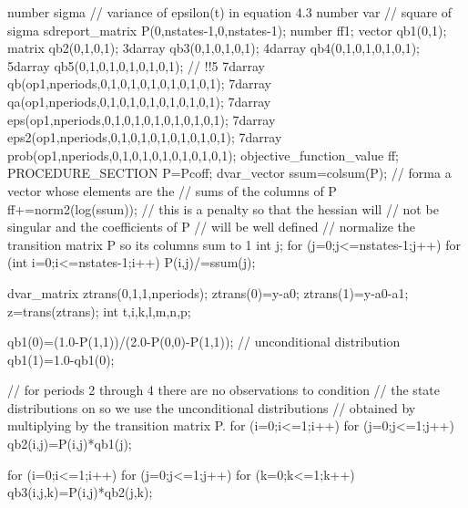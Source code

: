 \documentclass[12pt]{book}
\begin{document}
  number sigma // variance of epsilon(t) in equation 4.3
  number var  // square of sigma
  sdreport_matrix P(0,nstates-1,0,nstates-1);
  number ff1;
  vector qb1(0,1); 
  matrix qb2(0,1,0,1); 
  3darray qb3(0,1,0,1,0,1);
  4darray qb4(0,1,0,1,0,1,0,1);
  5darray qb5(0,1,0,1,0,1,0,1,0,1); // !!5
  7darray qb(op1,nperiods,0,1,0,1,0,1,0,1,0,1,0,1); 
  7darray qa(op1,nperiods,0,1,0,1,0,1,0,1,0,1,0,1);
  7darray eps(op1,nperiods,0,1,0,1,0,1,0,1,0,1,0,1);
  7darray eps2(op1,nperiods,0,1,0,1,0,1,0,1,0,1,0,1);
  7darray prob(op1,nperiods,0,1,0,1,0,1,0,1,0,1,0,1);
  objective_function_value ff;
PROCEDURE_SECTION
  P=Pcoff;
  dvar_vector ssum=colsum(P);  // forma a vector whose elements are the
                           // sums of the columns of P
  ff+=norm2(log(ssum)); // this is a penalty so that the hessian will
                        // not be singular and the coefficients of P 
                        // will be well defined
  // normalize the transition matrix P so its columns sum to 1
  int j;
  for (j=0;j<=nstates-1;j++)
  {
    for (int i=0;i<=nstates-1;i++)
    {
      P(i,j)/=ssum(j);
    }
  }  

  dvar_matrix ztrans(0,1,1,nperiods);
  ztrans(0)=y-a0;
  ztrans(1)=y-a0-a1;
  z=trans(ztrans);
  int t,i,k,l,m,n,p;
  
  qb1(0)=(1.0-P(1,1))/(2.0-P(0,0)-P(1,1)); // unconditional distribution
  qb1(1)=1.0-qb1(0);
  
  // for periods 2 through 4 there are no observations to condition
  // the state distributions on so we use the unconditional distributions
  // obtained by multiplying by the transition matrix P.
  for (i=0;i<=1;i++) {
    for (j=0;j<=1;j++) qb2(i,j)=P(i,j)*qb1(j);  
  }
  
  for (i=0;i<=1;i++) {
    for (j=0;j<=1;j++) {
      for (k=0;k<=1;k++) qb3(i,j,k)=P(i,j)*qb2(j,k); 
    }  
  }
  
\end{document}
